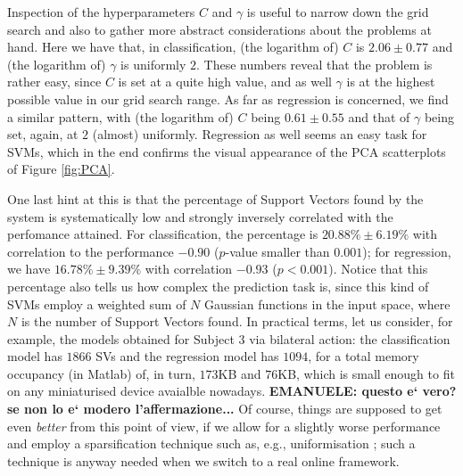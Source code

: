Inspection of the hyperparameters $C$ and $\gamma$ is useful to narrow
down the grid search and also to gather more abstract considerations
about the problems at hand. Here we have that, in classification, (the
logarithm of) $C$ is $2.06 \pm 0.77$ and (the logarithm of) $\gamma$
is uniformly $2$. These numbers reveal that the problem is rather
easy, since $C$ is set at a quite high value, and as well $\gamma$ is at
the highest possible value in our grid search range. As far as
regression is concerned, we find a similar pattern, with (the
logarithm of) $C$ being $0.61 \pm 0.55$ and that of $\gamma$ being
set, again, at $2$ (almost) uniformly. Regression as well seems an
easy task for SVMs, which in the end confirms the visual appearance of
the PCA scatterplots of Figure \ref{fig:PCA}.

One last hint at this is that the percentage of Support Vectors found
by the system is systematically low and strongly inversely correlated
with the perfomance attained. For classification, the percentage is
$20.88\% \pm 6.19\%$ with correlation to the performance $-0.90$
($p$-value smaller than $0.001$); for regression, we have $16.78\% \pm
9.39\%$ with correlation $-0.93$ ($p<0.001$). Notice that this
percentage also tells us how complex the prediction task is, since
this kind of SVMs employ a weighted sum of $N$ Gaussian functions in
the input space, where $N$ is the number of Support Vectors found. In
practical terms, let us consider, for example, the models obtained for
Subject $3$ via bilateral action: the classification model has $1866$
SVs and the regression model has $1094$, for a total memory occupancy
(in Matlab) of, in turn, $173$KB and $76$KB, which is small enough to
fit on any miniaturised device avaialble nowadays. \textbf{EMANUELE:
questo e` vero? se non lo e` modero l'affermazione...} Of course,
things are supposed to get even \emph{better} from this point of view,
if we allow for a slightly worse performance and employ a
sparsification technique such as, e.g., uniformisation
\cite{2008.ICRA,2008.BioCyb}; such a technique is anyway needed when
we switch to a real online framework.
